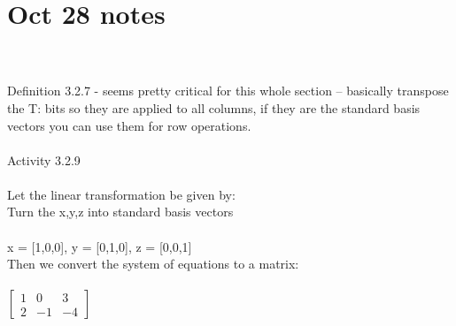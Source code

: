 \documentclass{article}
\begin{document}
\section*{Oct 28 notes}\\
\\
Definition 3.2.7 - seems pretty critical for this whole section -- basically transpose the T: bits so they are applied to all columns, if they are the standard basis vectors you can use them for row operations.\\
\\
Activity 3.2.9\\
\\
Let the linear transformation be given by:\\
Turn the x,y,z into standard basis vectors\\
\\
x = [1,0,0], y = [0,1,0], z = [0,0,1]\\
Then we convert the system of equations to a matrix:\\
\\
$\left[ \begin{matrix} 1 & 0 & 3\\ 2 & -1 & -4  \end{matrix} \right] $
 \\
\end{document}
